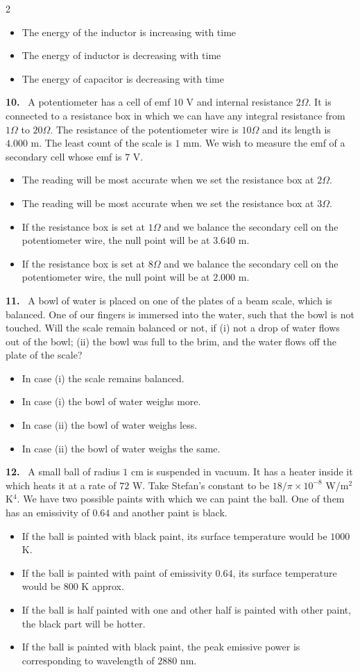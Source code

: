 \documentclass[10pt]{extarticle}
\newcommand{\qn}[1]{\par\smallskip\noindent\textbf{#1.}~}
\newenvironment{qoptions}{\begin{itemize}[leftmargin=1.8em,itemsep=1pt,topsep=2pt,label={}]}{\end{itemize}}
\newcommand{\opt}[2]{\item[(#1)] #2}
\begin{document}
\begin{multicols}{2}
\begin{qoptions}
\opt{B}{The energy of the inductor is increasing with time}
\opt{C}{The energy of inductor is decreasing with time}
\opt{D}{The energy of capacitor is decreasing with time}
\end{qoptions}
\qn{10} A potentiometer has a cell of emf $10$ V and internal resistance $2\Omega$. It is connected to a resistance box in which we can have any integral resistance from $1\Omega$ to $20\Omega$. The resistance of the potentiometer wire is $10\Omega$ and its length is $4.000$ m. The least count of the scale is $1$ mm. We wish to measure the emf of a secondary cell whose emf is $7$ V.
\begin{qoptions}
\opt{A}{The reading will be most accurate when we set the resistance box at $2\Omega$.}
\opt{B}{The reading will be most accurate when we set the resistance box at $3\Omega$.}
\opt{C}{If the resistance box is set at $1\Omega$ and we balance the secondary cell on the potentiometer wire, the null point will be at $3.640$ m.}
\opt{D}{If the resistance box is set at $8\Omega$ and we balance the secondary cell on the potentiometer wire, the null point will be at $2.000$ m.}
\end{qoptions}
\qn{11} A bowl of water is placed on one of the plates of a beam scale, which is balanced. One of our fingers is immersed into the water, such that the bowl is not touched. Will the scale remain balanced or not, if (i) not a drop of water flows out of the bowl; (ii) the bowl was full to the brim, and the water flows off the plate of the scale?
\begin{qoptions}
\opt{A}{In case (i) the scale remains balanced.}
\opt{B}{In case (i) the bowl of water weighs more.}
\opt{C}{In case (ii) the bowl of water weighs less.}
\opt{D}{In case (ii) the bowl of water weighs the same.}
\end{qoptions}
\qn{12} A small ball of radius $1$ cm is suspended in vacuum. It has a heater inside it which heats it at a rate of $72$ W. Take Stefan's constant to be $18/\pi\times10^{-8}$ W/m$^2$K$^4$. We have two possible paints with which we can paint the ball. One of them has an emissivity of $0.64$ and another paint is black.
\begin{qoptions}
\opt{A}{If the ball is painted with black paint, its surface temperature would be $1000$ K.}
\opt{B}{If the ball is painted with paint of emissivity $0.64$, its surface temperature would be $800$ K approx.}
\opt{C}{If the ball is half painted with one and other half is painted with other paint, the black part will be hotter.}
\opt{D}{If the ball is painted with black paint, the peak emissive power is corresponding to wavelength of $2880$ nm.}

\end{qoptions}
\end{multicols}
\end{document}
